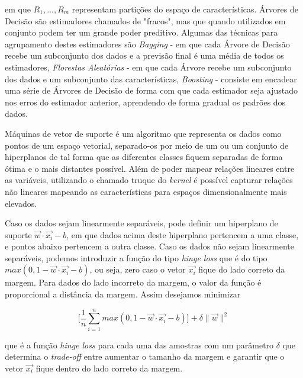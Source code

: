 \documentclass[twocolumn]{rbef}
\newcommand{\1}{\mathbbm{1}}
\begin{document}
em que $R_{1}, ..., R_{m}$ representam partições do espaço de características. Árvores de Decisão são estimadores chamados de "fracos", mas que quando utilizados em conjunto podem ter um grande poder preditivo. Algumas das técnicas para agrupamento destes estimadores são \textit{Bagging}\cite{BreimanBag} - em que cada Árvore de Decisão recebe um subconjunto dos dados e a previsão final é uma média de todos os estimadores, \textit{Florestas Aleatórias}\cite{BreimanRF} - em que cada Árvore recebe um subconjunto dos dados e um subconjunto das características, \textit{Boosting}\cite{BreimanB} - consiste em encadear uma série de Árvores de Decisão de forma com que cada estimador seja ajustado nos erros do estimador anterior, aprendendo de forma gradual os padrões dos dados.

Máquinas de vetor de suporte é um algoritmo que representa os dados como pontos de um espaço vetorial, separado-os por meio de um ou um conjunto de hiperplanos de tal forma que as diferentes classes fiquem separadas de forma ótima e o mais distantes possível\cite{Cortes}. Além de poder mapear relações lineares entre as variáveis, utilizando o chamado truque do \textit{kernel}\cite{Aizerman} é possível capturar relações não lineares mapeando as características para espaços dimensionalmente mais elevados.

Caso os dados sejam linearmente separáveis, pode definir um hiperplano de suporte $\vec{w} \cdot \vec{x_i} - b$, em que dados acima deste hiperplano pertencem a uma classe, e pontos abaixo pertencem a outra classe. Caso os dados não sejam linearmente separáveis, podemos introduzir a função do tipo \textit{hinge loss} que é do tipo $max(0, 1 - \vec{w} \cdot \vec{x_i} - b)$, ou seja, zero caso o vetor $\vec{x_{i}}$ fique do lado correto da margem. Para dados do lado incorreto da margem, o valor da função é proporcional a distância da margem. Assim desejamos minimizar

\begin{equation}
    \Bigg[ \frac{1}{n} \sum_{i=1}^{n} max(0, 1 - \vec{w} \cdot \vec{x_i} - b) \Bigg] + \delta \|\vec{w}\|^2
\end{equation}

que é a função \textit{hinge loss} para cada uma das amostras com um parâmetro $\delta$ que determina o \textit{trade-off} entre aumentar o tamanho da margem e garantir que o vetor $\vec{x_{i}}$ fique dentro do lado correto da margem.
\end{document}
